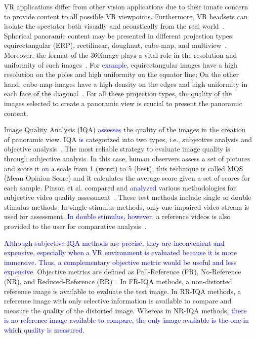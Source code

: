 \documentclass[10pt,conference]{IEEEtran}
\begin{document}
VR applications differ from other vision applications due to their innate concern to provide content to all possible VR viewpoints. Furthermore, VR headsets can isolate the spectator both visually and acoustically from the real world~\cite{fuchs2017virtual}.
Spherical panoramic content may be presented in different projection types: equirectangular (ERP), rectilinear, doughnut, cube-map, and multiview~\cite{zakharchenko2016quality}. Moreover, the format of the 360\degree image plays a vital role in the resolution and uniformity of such images~\cite{dunn2017resolution}. For \textcolor{blue}{example}, equirectangular images have a high resolution on the poles and high uniformity on the equator line; On the other hand, cube-map images have a high density on the edges and high uniformity in each face of the diagonal~\cite{duanmu:2018}. For all these projection types, the quality of the images selected to create a panoramic view is crucial to present the panoramic content.  \par

Image Quality Analysis (IQA) \textcolor{blue}{assesses} the quality of the images in the creation of panoramic view. IQA \textcolor{blue}{is} categorized into two types, i.e., subjective analysis and objective analysis~\cite{wang2006modern}. The most reliable strategy to evaluate image quality is through subjective analysis. In this case, human observers assess a set of pictures and score it \textcolor{blue}{on} a scale from 1 (worst) to 5 (best), this technique is called MOS (Mean Opinion Score) and it calculates the average score given a set of scores for each sample. Pinson et al. compared and \textcolor{blue}{analyzed} various methodologies for subjective video quality assessment~\cite{pinson:2003}. These test methods include single or double stimulus methods. In single stimulus methods\textcolor{blue}{,} only one impaired video stream is used for assessment. \textcolor{blue}{In double stimulus, however,} a reference videos is also provided to the user for comparative analysis~\cite{pinson:2003}.  \par

\textcolor{blue}{Although subjective IQA  methods are precise, they are inconvenient and expensive, especially when a VR environment is evaluated because it is more immersive. Thus, a complementary objective metric would be useful and less expensive.} Objective metrics are defined as Full-Reference (FR), No-Reference (NR), and Reduced-Reference (RR)~\cite{li:2019}. In FR-IQA methods, a non-distorted reference image is available to evaluate the test image. In RR-IQA methods, a reference image with only selective information is available to compare and measure the quality of the distorted image. Whereas in NR-IQA methods, \textcolor{blue}{there is no reference image available to compare, the only image available is the one in which quality is measured.}\par
\end{document}
